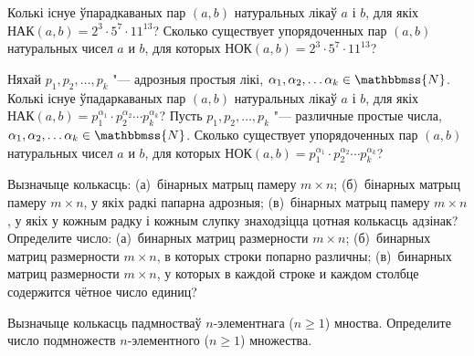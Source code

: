 \begin{problemList}
\problemItemSimple
{Колькі існуе ўпарадкаваных пар $(a,b)$ натуральных лікаў $a$ і $b$, для якіх $\text{НАК}(a,b) = 2^{3} \cdot 5^{7}\cdot 11^{13}$?}
{Сколько существует упорядоченных пар $(a,b)$ натуральных чисел $a$ и $b$, для которых $\text{НОК}(a,b) = 2^{3} \cdot 5^{7}\cdot 11^{13}$?}

\bigskip

\problemItemSimple
{Няхай $p_{1}, p_{2}, \dots, p_{k}$ "--- адрозныя простыя лікі, $\alpha_{1}, \alpha_{2}, \dots \alpha_{k} \in \mathbbmss{N}$. Колькі існуе ўпадаркаваных пар $(a,b)$  натуральных лікаў $a$ і $b$, для якіх $\text{НАК}(a,b) = p_{1} ^{\alpha_{1}} \cdot p_{2} ^{\alpha_{2}} \cdots p_{k} ^{\alpha_{k}}$?}
{Пусть $p_{1}, p_{2}, \dots, p_{k}$ "--- различные простые числа, $\alpha_{1}, \alpha_{2}, \dots \alpha_{k} \in \mathbbmss{N}$. Сколько существует упорядоченных пар $(a,b)$ натуральных чисел $a$ и $b$, для которых $\text{НОК}(a,b) = p_{1} ^{\alpha_{1}} \cdot p_{2} ^{\alpha_{2}} \cdots p_{k} ^{\alpha_{k}}$?}

\bigskip

\problemItemSimple
{Вызначыце колькасць: (а)~бінарных матрыц памеру $m \times n$; (б)~бінарных матрыц памеру $m \times n$, у якіх радкі папарна адрозныя; (в)~бінарных матрыц памеру $m \times n$, у якіх у кожным радку і кожным слупку знаходзіцца цотная колькасць адзінак?}
{Определите число: (а)~бинарных матриц размерности $m \times n$; (б)~бинарных матриц размерности $m \times n$, в которых строки попарно различны; (в)~бинарных матриц размерности $m \times n$, у которых в каждой строке и каждом столбце содержится чётное число единиц?}

\bigskip

\problemItemSimple
{Вызначыце колькасць падмностваў $n$-элементнага ($n \ge 1$) мноства.}
{Определите число подмножеств $n$-элементного ($n \ge 1$) множества.}

\end{problemList}



